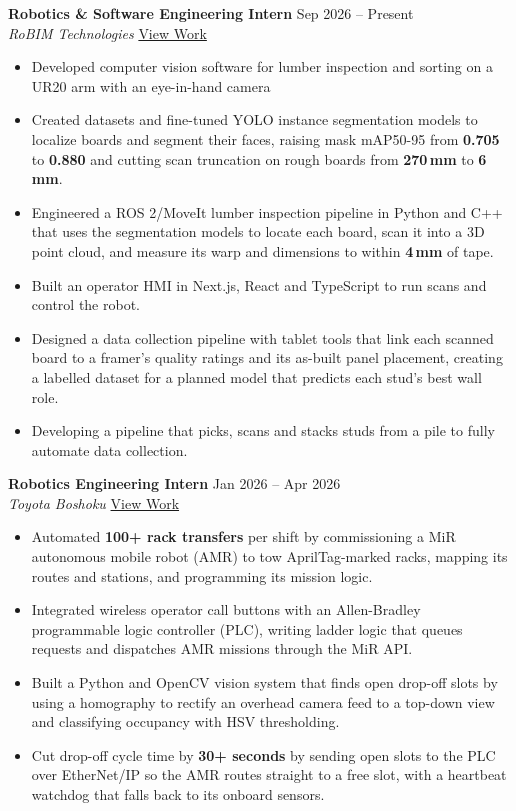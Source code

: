 \documentclass[letterpaper,10pt]{article}
\newcommand{\role}[4]{%
    \vspace{2pt}%
    \textbf{#1} \hfill #2\\
    \textit{#3} \hfill #4\par
}
\begin{document}
\role{Robotics \& Software Engineering Intern}{Sep 2026 -- Present}
     {RoBIM Technologies}{\href{https://johnsonyep.com/\#robim}{View Work}}
\begin{itemize}
    \item Developed computer vision software for lumber inspection and sorting on a UR20 arm with an eye-in-hand camera
    \item Created datasets and fine-tuned YOLO instance segmentation models to localize boards and segment their faces, raising mask mAP50-95 from \textbf{0.705} to \textbf{0.880} and cutting scan truncation on rough boards from \textbf{270\,mm} to \textbf{6\,mm}.
    \item Engineered a ROS 2/MoveIt lumber inspection pipeline in Python and C++ that uses the segmentation models to locate each board, scan it into a 3D point cloud, and measure its warp and dimensions to within \textbf{4\,mm} of tape.
    \item Built an operator HMI in Next.js, React and TypeScript to run scans and control the robot.
    \item Designed a data collection pipeline with tablet tools that link each scanned board to a framer's quality ratings and its as-built panel placement, creating a labelled dataset for a planned model that predicts each stud's best wall role.
    \item Developing a pipeline that picks, scans and stacks studs from a pile to fully automate data collection.
\end{itemize}

\role{Robotics Engineering Intern}{Jan 2026 -- Apr 2026}
     {Toyota Boshoku}{\href{https://johnsonyep.com/\#toyota}{View Work}}
\begin{itemize}
    \item Automated \textbf{100+ rack transfers} per shift by commissioning a MiR autonomous mobile robot (AMR) to tow AprilTag-marked racks, mapping its routes and stations, and programming its mission logic.
    \item Integrated wireless operator call buttons with an Allen-Bradley programmable logic controller (PLC), writing ladder logic that queues requests and dispatches AMR missions through the MiR API.
    \item Built a Python and OpenCV vision system that finds open drop-off slots by using a homography to rectify an overhead camera feed to a top-down view and classifying occupancy with HSV thresholding.
    \item Cut drop-off cycle time by \textbf{30+ seconds} by sending open slots to the PLC over EtherNet/IP so the AMR routes straight to a free slot, with a heartbeat watchdog that falls back to its onboard sensors.
\end{itemize}
\end{document}
